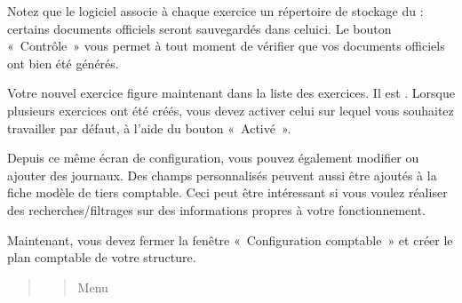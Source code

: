 \documentclass[a4paper,10pt,oneside,french]{sphinxmanual}
\begin{document}
\sphinxAtStartPar
Notez que le logiciel associe à chaque exercice un répertoire de stockage du  : certains documents
officiels seront sauvegardés dans celui\sphinxhyphen{}ci. Le bouton « Contrôle » vous permet à tout moment de  vérifier que vos documents officiels ont bien été générés.

\sphinxAtStartPar
Votre nouvel exercice figure maintenant dans la liste des exercices. Il est \sphinxstylestrong{{[}en création{]}}. Lorsque plusieurs exercices ont été créés, vous devez activer celui sur lequel vous souhaitez travailler par défaut, à l’aide du bouton « Activé ».
\begin{quote}

\sphinxAtStartPar
{}
\end{quote}

\sphinxAtStartPar
Depuis ce même écran de configuration, vous pouvez également modifier ou ajouter des journaux. Des champs personnalisés peuvent aussi être ajoutés à la fiche modèle de tiers comptable. Ceci peut être intéressant si vous voulez réaliser des recherches/filtrages sur des informations propres à votre fonctionnement.

\sphinxAtStartPar
Maintenant, vous devez fermer la fenêtre « Configuration comptable » et créer le plan comptable de votre structure.
\begin{quote}
\begin{quote}

\sphinxAtStartPar
Menu 
\end{quote}
\end{quote}
\end{document}

